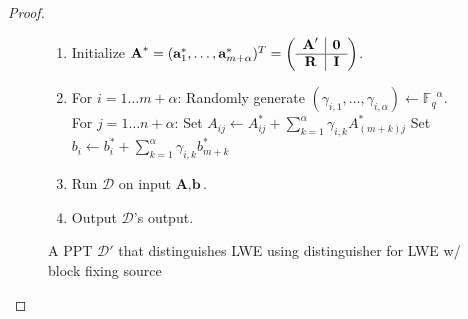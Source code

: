 \documentclass[11pt]{article}
\newcommand{\vect}[1]{\ensuremath{\textbf{#1}}}
\newcommand{\Fq}{\ensuremath{\mathbb{F}_q}}
\newcommand{\D}{\mathcal{D}}
\newcommand{\vA}{\vect{A}}
\newcommand{\va}{\vect{a}}
\newcommand{\vb}{\vect{b}}
\begin{document}
\begin{proof}
\begin{figure}
\begin{enumerate}
\item Initialize $\vA^* = (\va^*_1, \ldots, \va^*_{m+\alpha})^T = \left(\begin{array}{c | c}\vA' & \mathbf{0}\\\hline \vect{R} & \vect{I}\end{array}\right)$.
\item \label{step:randomization}
For {$i=1\ldots m+\alpha$}:
\subitem Randomly generate $(\gamma_{i,1},\ldots, \gamma_{i,\alpha}) \leftarrow \Fq^\alpha$.
 \subitem For {$j = 1 \ldots n+\alpha$}:
\subsubitem Set $A_{ij} \leftarrow A^*_{ij}+\sum_{k=1}^\alpha \gamma_{i, k} A^*_{(m+k)j}$
\subsubitem Set $b_i \leftarrow b^*_i +  \sum_{k=1}^\alpha\gamma_{i, k} b^*_{m+k}$
\item Run $\D$ on input $\vA, \vb$.
\item Output $\D$'s output.
\end{enumerate}
\caption{A PPT $\mathcal{D'}$ that distinguishes LWE using distinguisher for LWE w/ block fixing source}
\label{fig:perfectLWEreduction}
\end{figure}


\end{proof}
\end{document}
